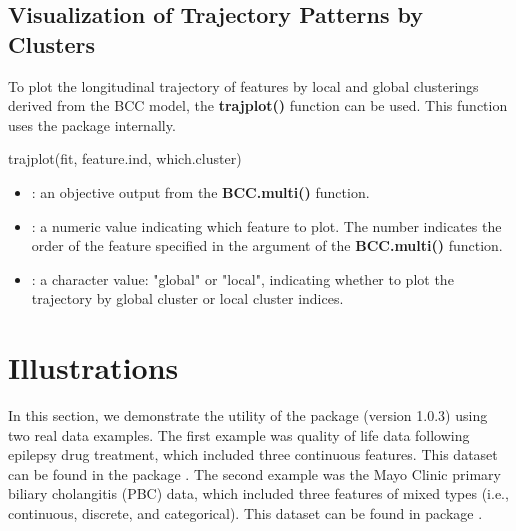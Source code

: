 \subsection{Visualization of Trajectory Patterns by Clusters}
To plot the longitudinal trajectory of features by local and global clusterings derived from the BCC model, the \textbf{trajplot()} function can be used. This function uses the  package internally. 
\begin{example}
trajplot(fit, feature.ind, which.cluster)
\end{example}
\begin{itemize}
	\item {}: an objective output from the \textbf{BCC.multi()} function.  
	\item {}: a numeric value indicating which feature to plot. The number indicates the order of the feature specified in the  argument of the \textbf{BCC.multi()} function.
	\item {}:  a character value: "global" or "local", indicating whether to plot the trajectory by global cluster or local cluster indices. 
\end{itemize}
\section{Illustrations} \label{sec:illustrations}
In this section, we demonstrate the utility of the  package (version 1.0.3) using two real data examples. The first example was quality of life data following epilepsy drug treatment, which included three continuous features. This dataset can be found in the  package \citep{Hickey2018}. The second example was the Mayo Clinic primary biliary cholangitis (PBC) data, which included three features of mixed types (i.e., continuous, discrete, and categorical).  This dataset can be found in  package \citep{Komarek2014}.
